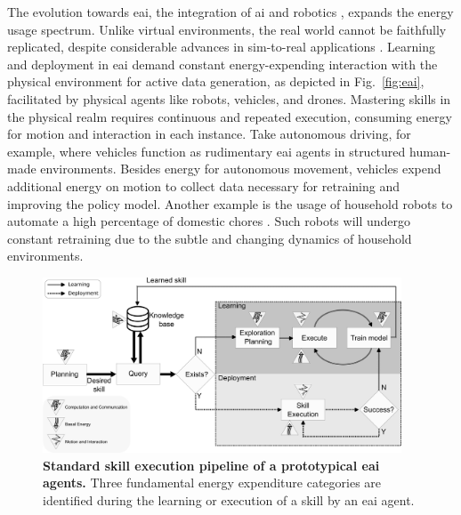 \documentclass[12pt]{article}
\begin{document}
The evolution towards \ac{eai}, the integration of \ac{ai} and robotics \cite{Pfeifer2004Embodiedartificialintelligence}, expands the energy usage spectrum. Unlike virtual environments, the real world cannot be faithfully replicated, despite considerable advances in sim-to-real applications \cite{Chebotar2019Closingsimreal}. Learning and deployment in \ac{eai} demand constant energy-expending interaction with the physical environment for active data generation, as depicted in Fig.~\ref{fig:eai}, facilitated by physical agents like robots, vehicles, and drones. Mastering skills in the physical realm requires continuous and repeated execution, consuming energy for motion and interaction in each instance. Take autonomous driving, for example, where vehicles function as rudimentary \ac{eai} agents in structured human-made environments. Besides energy for autonomous movement, vehicles expend additional energy on motion to collect data necessary for retraining and improving the policy model. Another example is the usage of household robots to automate a high percentage of domestic chores \cite{Lehdonvirta2022futuresunpaidwork}. Such robots will undergo constant retraining due to the subtle and changing dynamics of household environments.
\begin{figure}[t!]
	\centering
	\hspace*{\fill}
	\includegraphics[width=0.95\textwidth]{embodied_ai_learning_pipeline.png}
	\hspace*{\fill}
	\caption[] {\label{fig:embodied_ai_pipeline} \textbf{Standard skill execution pipeline of a prototypical \ac{eai} agents.} {Three fundamental energy expenditure categories are identified during the learning or execution of a skill by an \ac{eai} agent.}}
\end{figure}
\end{document}
